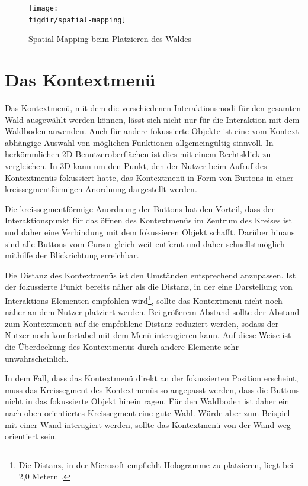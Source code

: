 \begin{figure}[htb]
  \texttt{[image: \\figdir/spatial-mapping]}
  \caption{Spatial Mapping beim Platzieren des Waldes}
  \label{fig:spatial-mapping}
\end{figure}

\section{Das Kontextmenü}
Das Kontextmenü, mit dem die verschiedenen Interaktionsmodi für den gesamten Wald ausgewählt werden können, lässt sich nicht nur für die Interaktion mit dem Waldboden anwenden. Auch für andere fokussierte Objekte ist eine vom Kontext abhängige Auswahl von möglichen Funktionen allgemeingültig sinnvoll. In herkömmlichen 2D Benutzeroberflächen ist dies mit einem Rechtsklick zu vergleichen. In 3D kann um den Punkt, den der Nutzer beim Aufruf des Kontextmenüs fokussiert hatte, das Kontextmenü in Form von Buttons in einer kreissegmentförmigen Anordnung dargestellt werden.

Die kreissegmentförmige Anordnung der Buttons hat den Vorteil, dass der Interaktionspunkt für das öffnen des Kontextmenüs im Zentrum des Kreises ist und daher eine Verbindung mit dem fokussieren Objekt schafft. Darüber hinaus sind alle Buttons vom Cursor gleich weit entfernt und daher schnellstmöglich mithilfe der Blickrichtung erreichbar.

Die Distanz des Kontextmenüs ist den Umständen entsprechend anzupassen. Ist der fokussierte Punkt bereits näher als die Distanz, in der eine Darstellung von Interaktions-Elementen empfohlen wird\footnote{Die Distanz, in der Microsoft empfiehlt Hologramme zu platzieren, liegt bei 2,0 Metern \cite{windows2017interaction}.}, sollte das Kontextmenü nicht noch näher an dem Nutzer platziert werden. Bei größerem Abstand sollte der Abstand zum Kontextmenü auf die empfohlene Distanz reduziert werden, sodass der Nutzer noch komfortabel mit dem Menü interagieren kann. Auf diese Weise ist die Überdeckung des Kontextmenüs durch andere Elemente sehr unwahrscheinlich.

In dem Fall, dass das Kontextmenü direkt an der fokussierten Position erscheint, muss das Kreissegment des Kontextmenüs so angepasst werden, dass die Buttons nicht in das fokussierte Objekt hinein ragen. Für den Waldboden ist daher ein nach oben orientiertes Kreissegment eine gute Wahl. Würde aber zum Beispiel mit einer Wand interagiert werden, sollte das Kontextmenü von der Wand weg orientiert sein.

